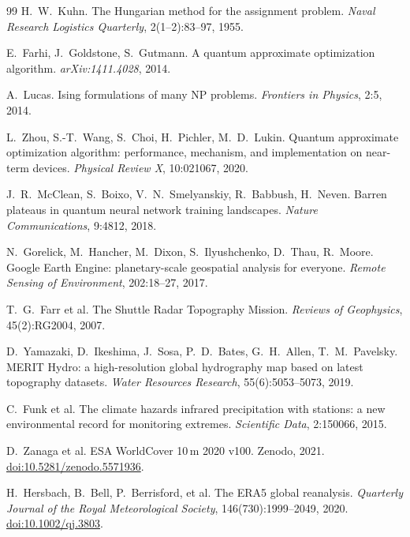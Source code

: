 \documentclass[10pt,twocolumn]{article}
\begin{document}
{\begin{thebibliography}{99}
H.~W.~Kuhn.
The Hungarian method for the assignment problem.
\emph{Naval Research Logistics Quarterly}, 2(1--2):83--97, 1955.

E.~Farhi, J.~Goldstone, S.~Gutmann.
A quantum approximate optimization algorithm.
\emph{arXiv:1411.4028}, 2014.

A.~Lucas. Ising formulations of many NP problems.
\emph{Frontiers in Physics}, 2:5, 2014.

L.~Zhou, S.-T.~Wang, S.~Choi, H.~Pichler, M.~D.~Lukin.
Quantum approximate optimization algorithm: performance, mechanism, and
implementation on near-term devices.
\emph{Physical Review X}, 10:021067, 2020.

J.~R.~McClean, S.~Boixo, V.~N.~Smelyanskiy, R.~Babbush, H.~Neven.
Barren plateaus in quantum neural network training landscapes.
\emph{Nature Communications}, 9:4812, 2018.

N.~Gorelick, M.~Hancher, M.~Dixon, S.~Ilyushchenko, D.~Thau, R.~Moore.
Google Earth Engine: planetary-scale geospatial analysis for everyone.
\emph{Remote Sensing of Environment}, 202:18--27, 2017.

T.~G.~Farr et al.
The Shuttle Radar Topography Mission.
\emph{Reviews of Geophysics}, 45(2):RG2004, 2007.

D.~Yamazaki, D.~Ikeshima, J.~Sosa, P.~D.~Bates, G.~H.~Allen, T.~M.~Pavelsky.
MERIT Hydro: a high-resolution global hydrography map based on latest topography
datasets.
\emph{Water Resources Research}, 55(6):5053--5073, 2019.

C.~Funk et al.
The climate hazards infrared precipitation with stations: a new environmental
record for monitoring extremes.
\emph{Scientific Data}, 2:150066, 2015.

D.~Zanaga et al. ESA WorldCover 10\,m 2020 v100. Zenodo, 2021.
\href{https://doi.org/10.5281/zenodo.5571936}{doi:10.5281/zenodo.5571936}.

H.~Hersbach, B.~Bell, P.~Berrisford, et al.
The ERA5 global reanalysis.
\emph{Quarterly Journal of the Royal Meteorological Society}, 146(730):1999--2049, 2020.
\href{https://doi.org/10.1002/qj.3803}{doi:10.1002/qj.3803}.


\end{thebibliography}}
\end{document}

